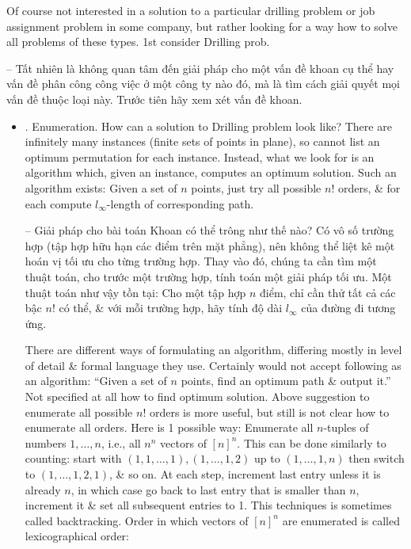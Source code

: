 \documentclass{article}
\begin{document}
\begin{itemize}
    Of course not interested in a solution to a particular drilling problem or job assignment problem in some company, but rather looking for a way how to solve all problems of these types. 1st consider Drilling prob.

    -- Tất nhiên là không quan tâm đến giải pháp cho một vấn đề khoan cụ thể hay vấn đề phân công công việc ở một công ty nào đó, mà là tìm cách giải quyết mọi vấn đề thuộc loại này. Trước tiên hãy xem xét vấn đề khoan.
    \begin{itemize}
        \item {. Enumeration.} How can a solution to Drilling problem look like? There are infinitely many instances (finite sets of points in plane), so cannot list an optimum permutation for each instance. Instead, what we look for is an algorithm which, given an instance, computes an optimum solution. Such an algorithm exists: Given a set of $n$ points, just try all possible $n!$ orders, \& for each compute $l_\infty$-length of corresponding path.

        -- Giải pháp cho bài toán Khoan có thể trông như thế nào? Có vô số trường hợp (tập hợp hữu hạn các điểm trên mặt phẳng), nên không thể liệt kê một hoán vị tối ưu cho từng trường hợp. Thay vào đó, chúng ta cần tìm một thuật toán, cho trước một trường hợp, tính toán một giải pháp tối ưu. Một thuật toán như vậy tồn tại: Cho một tập hợp $n$ điểm, chỉ cần thử tất cả các bậc $n!$ có thể, \& với mỗi trường hợp, hãy tính độ dài $l_\infty$ của đường đi tương ứng.

        There are different ways of formulating an algorithm, differing mostly in level of detail \& formal language they use. Certainly would not accept following as an algorithm: ``Given a set of $n$ points, find an optimum path \& output it.'' Not specified at all how to find optimum solution. Above suggestion to enumerate all possible $n!$ orders is more useful, but still is not clear how to enumerate all orders. Here is 1 possible way: Enumerate all $n$-tuples of numbers $1,\ldots,n$, i.e., all $n^n$ vectors of $[n]^n$. This can be done similarly to counting: start with $(1,1,\ldots,1),(1,\ldots,1,2)$ up to $(1,\ldots,1,n)$ then switch to $(1,\ldots,1,2,1)$, \& so on. At each step, increment last entry unless it is already $n$, in which case go back to last entry that is smaller than $n$, increment it \& set all subsequent entries to 1. This techniques is sometimes called backtracking. Order in which vectors of $[n]^n$ are enumerated is called lexicographical order:


\end{itemize}
\end{itemize}
\end{document}
